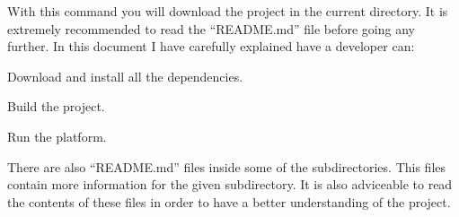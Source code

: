 With this command you will download the project in the current directory. It is
extremely recommended to read the ``README.md'' file before going any further.
In this document I have carefully explained have a developer can:

\mylist
  \item Download and install all the dependencies.
  \item Build the project.
  \item Run the platform.
\mylistend

There are also ``README.md'' files inside some of the subdirectories. This
files contain more information for the given subdirectory. It is also
adviceable to read the contents of these files in order to have a better
understanding of the project.
